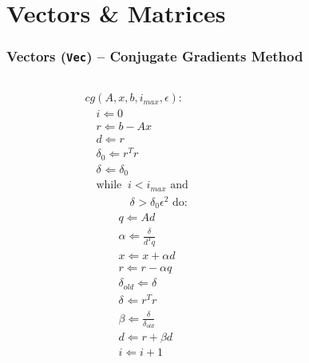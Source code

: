 \documentclass{beamer}
\begin{document}

\section{Vectors \& Matrices}

\begin{frame}
  \frametitle{Vectors (\texttt{Vec}) -- Conjugate Gradients Method}
  \begin{columns}[t]
    \begin{column}{.45\textwidth}
      \tiny
      \begin{equation*}
        \begin{split}
          & cg(A,x,b,i_{max},\epsilon): \\
          & \quad i \Leftarrow 0 \\
          & \quad r \Leftarrow b - A x \\
          & \quad d \Leftarrow r \\
          & \quad \delta_{0} \Leftarrow r^T r \\
          & \quad \delta_{   } \Leftarrow \delta_{0} \\
          & \quad \text{while}\;\; i < i_{max} \text{ and } \\
          & \quad\quad\qquad  \delta_{   } > \delta_{0} \epsilon^2 \text{ do} :\\
          & \quad\quad\quad  q \Leftarrow Ad \\
          & \quad\quad\quad  \alpha \Leftarrow \frac{\delta_{   }}{d^T q} \\
          & \quad\quad\quad  x \Leftarrow x + \alpha d\\
          & \quad\quad\quad  r \Leftarrow r - \alpha q\\
          & \quad\quad\quad  \delta_{old} \Leftarrow \delta_{   } \\
          & \quad\quad\quad  \delta_{   } \Leftarrow r^T r \\
          & \quad\quad\quad  \beta \Leftarrow \frac{\delta_{   }}{\delta_{old}} \\
          & \quad\quad\quad  d \Leftarrow r + \beta d\\
          & \quad\quad\quad  i \Leftarrow i + 1
        \end{split}
      \end{equation*}
    \end{column}
    \begin{column}{.45\textwidth}
      \tiny\inputminted[linenos]{python}{petsc4py_vec.py}
    \end{column}
  \end{columns}
\end{frame}
\end{document}
